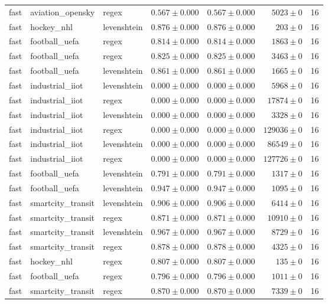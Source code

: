 \begin{table}[htbp]
\begin{tabular}{l l l r r r r}
fast & aviation\_opensky & regex & $0.567\pm0.000$ & $0.567\pm0.000$ & $5023\pm0$ & 16 \\
fast & hockey\_nhl & levenshtein & $0.876\pm0.000$ & $0.876\pm0.000$ & $203\pm0$ & 16 \\
fast & football\_uefa & regex & $0.814\pm0.000$ & $0.814\pm0.000$ & $1863\pm0$ & 16 \\
fast & football\_uefa & regex & $0.825\pm0.000$ & $0.825\pm0.000$ & $3463\pm0$ & 16 \\
fast & football\_uefa & levenshtein & $0.861\pm0.000$ & $0.861\pm0.000$ & $1665\pm0$ & 16 \\
fast & industrial\_iiot & levenshtein & $0.000\pm0.000$ & $0.000\pm0.000$ & $5968\pm0$ & 16 \\
fast & industrial\_iiot & regex & $0.000\pm0.000$ & $0.000\pm0.000$ & $17874\pm0$ & 16 \\
fast & industrial\_iiot & levenshtein & $0.000\pm0.000$ & $0.000\pm0.000$ & $3328\pm0$ & 16 \\
fast & industrial\_iiot & regex & $0.000\pm0.000$ & $0.000\pm0.000$ & $129036\pm0$ & 16 \\
fast & industrial\_iiot & levenshtein & $0.000\pm0.000$ & $0.000\pm0.000$ & $86549\pm0$ & 16 \\
fast & industrial\_iiot & regex & $0.000\pm0.000$ & $0.000\pm0.000$ & $127726\pm0$ & 16 \\
fast & football\_uefa & levenshtein & $0.791\pm0.000$ & $0.791\pm0.000$ & $1317\pm0$ & 16 \\
fast & football\_uefa & levenshtein & $0.947\pm0.000$ & $0.947\pm0.000$ & $1095\pm0$ & 16 \\
fast & smartcity\_transit & levenshtein & $0.906\pm0.000$ & $0.906\pm0.000$ & $6414\pm0$ & 16 \\
fast & smartcity\_transit & regex & $0.871\pm0.000$ & $0.871\pm0.000$ & $10910\pm0$ & 16 \\
fast & smartcity\_transit & levenshtein & $0.967\pm0.000$ & $0.967\pm0.000$ & $8729\pm0$ & 16 \\
fast & smartcity\_transit & regex & $0.878\pm0.000$ & $0.878\pm0.000$ & $4325\pm0$ & 16 \\
fast & hockey\_nhl & regex & $0.807\pm0.000$ & $0.807\pm0.000$ & $135\pm0$ & 16 \\
fast & football\_uefa & regex & $0.796\pm0.000$ & $0.796\pm0.000$ & $1011\pm0$ & 16 \\
fast & smartcity\_transit & regex & $0.870\pm0.000$ & $0.870\pm0.000$ & $7339\pm0$ & 16 \\

\end{tabular}
\end{table}
